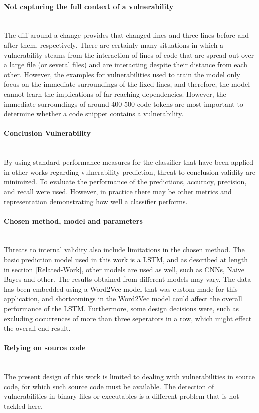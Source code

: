\documentclass[
	a4paper,
	pagesize,
	pdftex,
	12pt,
	twoside, %
	BCOR=5mm, %
	ngerman,
	fleqn,
	final,
	]{scrartcl}
\begin{document}
\paragraph{Not capturing the full context of a vulnerability}\mbox{}\\
The diff around a change provides that changed lines and three lines before and after them, respectively. There are certainly many situations in which a vulnerability steams from the interaction of lines of code that are spread out over a large file (or several files) and are interacting despite their distance from each other. However, the examples for vulnerabilities used to train the model only focus on the immediate surroundings of the fixed lines, and therefore, the model cannot learn the implications of far-reaching dependencies. However, the immediate surroundings of around 400-500 code tokens are most important to determine whether a code snippet contains a vulnerability. %
\paragraph{Conclusion Vulnerability}\mbox{}\\
By using standard performance measures for the classifier that have been applied in other works regarding vulnerability prediction, threat to conclusion validity are minimized. To evaluate the performance of the predictions, accuracy, precision, and recall were used. However, in practice there may be other metrics and representation demonstrating how well a classifier performs.
\paragraph{Chosen method, model and parameters}\mbox{}\\
Threats to internal validity also include limitations in the chosen method. The basic prediction model used in this work is a LSTM, and as described at length in section \ref{Related-Work}, other models are used as well, such as CNNs, Naive Bayes and other. The results obtained from different models may vary. The data has been embedded using a Word2Vec model that was custom made for this application, and shortcomings in the Word2Vec model could affect the overall performance of the LSTM. Furthermore, some design decisions were, such as excluding occurrences of more than three seperators in a row, which might effect the overall end result.  
\paragraph{Relying on source code}\mbox{}\\
The present design of this work is limited to dealing with vulnerabilities in source code, for which such source code must be available. The detection of vulnerabilities in binary files or executables is a different problem that is not tackled here. 
\end{document}
